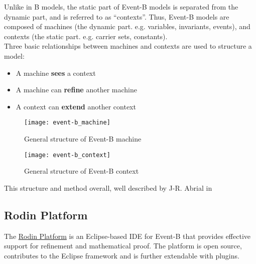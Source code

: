 Unlike in B models, the static part of Event-B models is separated
from the dynamic part, and is referred to as ``contexts''. Thus, Event-B models
are composed of machines (the dynamic part. e.g. variables, invariants, events),
and contexts (the static part. e.g. carrier sets, constants).\\

Three basic relationships between machines and contexts are used to structure a
model:  

\begin{itemize}
  \item A machine \textbf{sees} a context
  \item A machine can \textbf{refine} another machine
  \item A context can \textbf{extend} another context
\end{itemize}

\begin{figure}[h]
  \centering
  \texttt{[image: event-b\_machine]}
  \caption{General structure of Event-B machine} 
\end{figure} 

\begin{figure}[h]
  \centering
  \texttt{[image: event-b\_context]}
  \caption{General structure of Event-B context} 
\end{figure} 
This structure and method overall, well described by J-R. Abrial in \cite{eventb}

\subsection{Rodin Platform}

The
\href{http://wiki.event-b.org/index.php/Main_Page}{Rodin Platform}
is an Eclipse-based IDE for Event-B that provides effective
support for refinement and mathematical proof. The platform is open source,
contributes to the Eclipse framework and is further extendable with plugins.  

